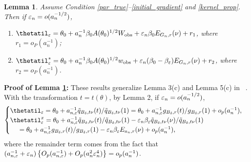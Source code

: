 \documentclass{article}
\newtheorem{lemma}{Lemma}
\begin{document}
\begin{lemma}\label{Alemma3} Assume Condition \ref{par_true}--\ref{initial_gradient} and \ref{kernel_prop}. Then if $\varepsilon_{n}=o(a_{n}^{-1/2})$, 
	\begin{enumerate}
		\item[(i)] $\thetatil_{\veps}=\theta_{0}+a_{n}^{-1}\beta_{0}A(\theta_{0})^{1/2}W_{\rm obs}+\veps_{n}\beta_{0}E_{G_{n},r}(\nu)+r_{1}$,
		where $r_{1}=o_{P}(a_{n}^{-1})$; 
		\item[(ii)] $\thetatil_{\veps}^{*}=\theta_{0}+a_{n}^{-1}\beta_{0}A(\theta_{0})^{1/2}w_{\rm obs}+\veps_{n}(\beta_{0}-\beta_{\veps})E_{G_{n},r}(\nu)+r_{2}$,
		where $r_{2}=o_{P}(a_{n}^{-1})$. 
	\end{enumerate}\end{lemma}
{\bf Proof of Lemma \ref{Alemma3}:} 
	These results generalize Lemma 3(c) and Lemma 5(c) in ~\cite{Li2017}.
	With the transformation $t=t(\theta)$, by Lemma 2, if $\varepsilon_{n}=o(a_{n}^{-1/2})$,
	\begin{eqnarray}
	\begin{cases}
	\thetatil_{\veps}=\theta_{0}+a_{n,\veps}^{-1}\tilde{q}_{B_{\delta},t\nu}(t)/\tilde{q}_{B_{\delta},t\nu}(1)=\theta_{0}+a_{n,\veps}^{-1}g_{B_{\delta},r}(t)/g_{B_{\delta},r}(1)+o_{p}(a_{n}^{-1}),\\
	\thetatil_{\veps}^{x}=\theta_{0}+a_{n,\veps}^{-1}\tilde{q}_{B_{\delta},t\nu}(t)/\tilde{q}_{B_{\delta},t\nu}(1)-\veps_{n}\beta_{\veps}\tilde{q}_{B_{\delta},t\nu}(\nu)/\tilde{q}_{B_{\delta},t\nu}(1)\\
	\hspace{5mm} =\theta_{0}+a_{n,\veps}^{-1}g_{B_{\delta},r}(t)/g_{B_{\delta},r}(1)-\veps_{n}\beta_{\veps}E_{a_{n},r}(\nu)+o_{p}(a_{n}^{-1}),
	\end{cases}\label{eq4}
	\end{eqnarray}
	where the remainder term comes from the fact that $(a_{n,\varepsilon}^{-1}+\varepsilon_{n})\left\{ O_{p}(a_{n,\varepsilon}^{-1})+O_{p}(a_{n}^{2}\varepsilon_{n}^{4})\right\} =o_{p}(a_{n}^{-1})$.
	
\end{document}
